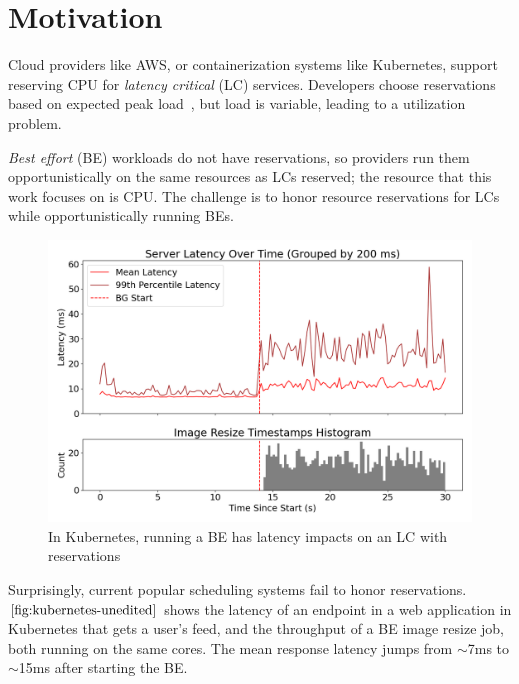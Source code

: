 \section{Motivation}

Cloud providers like AWS, or containerization systems like Kubernetes, support
reserving CPU for \textit{latency critical} (LC) services. Developers choose
reservations based on expected peak load~\cite{borg, nu, overprovision}, but
load is variable, leading to a utilization problem. 

\textit{Best effort} (BE) workloads do not have reservations, so providers run
them opportunistically on the same resources as LCs reserved; the resource that
this work focuses on is CPU. The challenge is to honor resource reservations for
LCs while opportunistically running BEs.

\begin{figure}[t]
    \centering
    \includegraphics[width=\columnwidth]{graphs/kubernetes-unedited.png}
    \caption{In Kubernetes, running a BE has latency impacts on an LC with
    reservations}\label{fig:kubernetes-unedited}
\end{figure}

Surprisingly, current popular scheduling systems fail to honor reservations.
$\autoref{fig:kubernetes-unedited}$ shows the latency of an endpoint in a web
application in Kubernetes that gets a user's feed, and the throughput of a BE
image resize job, both running on the same cores. The mean response latency
jumps from $\sim$7ms to $\sim$15ms after starting the BE.



